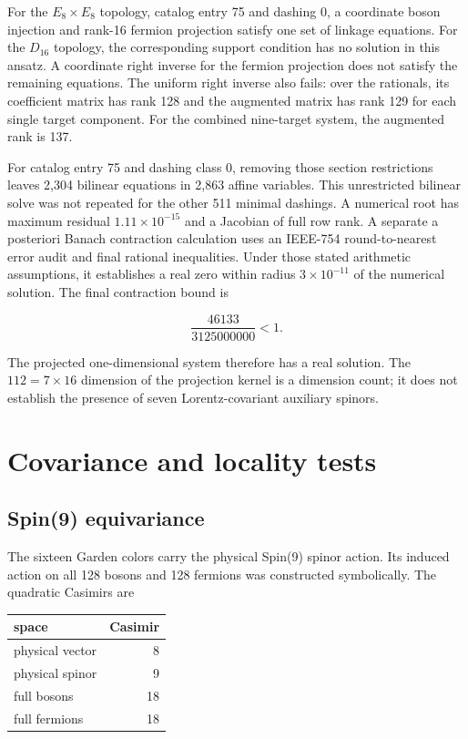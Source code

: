 \documentclass[11pt]{article}
\begin{document}
For the $E_8\times E_8$ topology, catalog entry 75 and dashing 0, a
coordinate boson injection and rank-16 fermion projection satisfy one set of
linkage equations.  For the $D_{16}$ topology, the corresponding support
condition has no solution in this ansatz.  A coordinate right inverse for the
fermion projection does not satisfy the remaining equations.  The uniform right
inverse also fails: over the rationals, its coefficient matrix has rank 128 and
the augmented matrix has rank 129 for each single target component.  For the
combined nine-target system, the augmented rank is 137.

For catalog entry 75 and dashing class 0, removing those section restrictions
leaves 2,304 bilinear equations in 2,863 affine variables.  This unrestricted
bilinear solve was not repeated for the other 511 minimal dashings.  A numerical
root has maximum residual $1.11\times10^{-15}$ and a Jacobian of full row rank.
A separate a posteriori Banach contraction calculation uses
an IEEE-754 round-to-nearest error audit and final rational inequalities.  Under
those stated arithmetic assumptions, it establishes a real zero within radius
$3\times10^{-11}$ of the numerical solution.  The final contraction bound is

\begin{equation}
\frac{46133}{3125000000}<1.
\end{equation}

The projected one-dimensional system therefore has a real solution.  The
$112=7\times16$ dimension of the projection kernel is a dimension count; it does
not establish the presence of seven Lorentz-covariant auxiliary spinors.

\section{Covariance and locality tests}

\subsection{Spin(9) equivariance}

The sixteen Garden colors carry the physical Spin(9) spinor action.  Its
induced action on all 128 bosons and 128 fermions was constructed symbolically.  The
quadratic Casimirs are

\begin{center}
\begin{tabular}{@{}lr@{}}
\toprule
space & Casimir \\
\midrule
physical vector & 8 \\
physical spinor & 9 \\
full bosons & 18 \\
full fermions & 18 \\
\bottomrule
\end{tabular}
\end{center}
\end{document}

